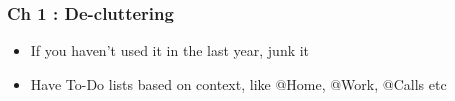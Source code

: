 \begin{frame}[fragile]
\frametitle{Ch 1 : De-cluttering}
\begin{itemize}[noitemsep,nolistsep]
\item If you haven't used it in the last year, junk it
\item Have To-Do lists based on context, like @Home, @Work, @Calls etc
\end{itemize}
\end{frame}

